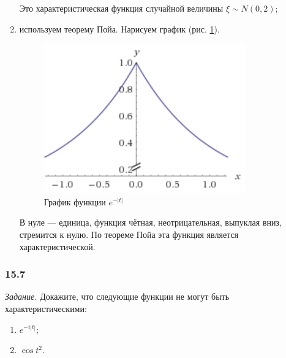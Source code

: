\begin{enumerate}[label=\alph*)]
Это характеристическая функция случайной величины $ \xi \sim N \left( 0, 2 \right) $;

\item используем теорему Пойа.
Нарисуем график (рис. \ref{fig:156}).

\begin{figure}[h!]
  \centering
  \includegraphics[width=.4\textwidth]{./pictures/15_6.png}
  \caption{График функции $e^{ - \left| t \right| }$}
  \label{fig:156}
\end{figure}

В нуле --- единица, функция чётная, неотрицательная, выпуклая вниз, стремится к нулю.
По теореме Пойа эта функция является характеристической.
\end{enumerate}

\subsubsection*{15.7}

\textit{Задание.} Докажите, что следующие функции не могут быть характеристическими:
\begin{enumerate}[label=\alph*)]
\item $e^{- i \left| t \right| }$;
\item $ \cos t^2$.
\end{enumerate}

